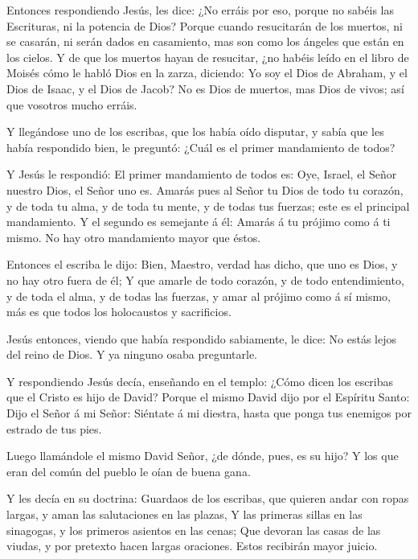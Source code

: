  Entonces respondiendo Jesús, les dice: ¿No erráis por eso,
porque no sabéis las Escrituras, ni la potencia de Dios? 
Porque cuando resucitarán de los muertos, ni se casarán, ni serán dados
en casamiento, mas son como los ángeles que están en los cielos.
 Y de que los muertos hayan de resucitar, ¿no habéis leído
en el libro de Moisés cómo le habló Dios en la zarza, diciendo: Yo soy
el Dios de Abraham, y el Dios de Isaac, y el Dios de Jacob?
 No es Dios de muertos, mas Dios de vivos; así que vosotros
mucho erráis.

 Y llegándose uno de los escribas, que los había oído
disputar, y sabía que les había respondido bien, le preguntó: ¿Cuál es
el primer mandamiento de todos?

 Y Jesús le respondió: El primer mandamiento de todos es:
Oye, Israel, el Señor nuestro Dios, el Señor uno es. 
Amarás pues al Señor tu Dios de todo tu corazón, y de toda tu alma, y de
toda tu mente, y de todas tus fuerzas; este es el principal mandamiento.
 Y el segundo es semejante á él: Amarás á tu prójimo como á
ti mismo. No hay otro mandamiento mayor que éstos.

 Entonces el escriba le dijo: Bien, Maestro, verdad has
dicho, que uno es Dios, y no hay otro fuera de él;  Y que
amarle de todo corazón, y de todo entendimiento, y de toda el alma, y de
todas las fuerzas, y amar al prójimo como á sí mismo, más es que todos
los holocaustos y sacrificios.

 Jesús entonces, viendo que había respondido sabiamente, le
dice: No estás lejos del reino de Dios. Y ya ninguno osaba preguntarle.

 Y respondiendo Jesús decía, enseñando en el templo: ¿Cómo
dicen los escribas que el Cristo es hijo de David?  Porque
el mismo David dijo por el Espíritu Santo: Dijo el Señor á mi Señor:
Siéntate á mi diestra, hasta que ponga tus enemigos por estrado de tus
pies.

 Luego llamándole el mismo David Señor, ¿de dónde, pues, es
su hijo? Y los que eran del común del pueblo le oían de buena gana.

 Y les decía en su doctrina: Guardaos de los escribas, que
quieren andar con ropas largas, y aman las salutaciones en las plazas,
 Y las primeras sillas en las sinagogas, y los primeros
asientos en las cenas;  Que devoran las casas de las
viudas, y por pretexto hacen largas oraciones. Estos recibirán mayor
juicio.


